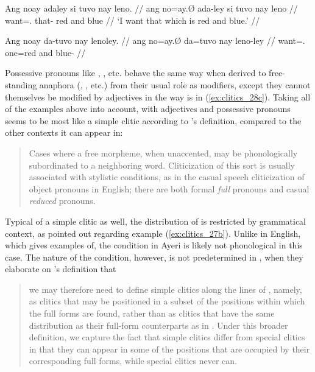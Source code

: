 \a\label{ex:clitics_29c}\begingl
	\gla Ang noay adaley si tuvo nay leno. //
	\glb ang no=ay.Ø ada-ley si tuvo nay leno //
	\glc \AgtT{} want=\Fsg{}.\Top{} that-\PargI{} \Rel{} red and blue //
	\glft `I want that which is red and blue.' //
\endgl

\a\label{ex:clitics_29d}\ljudge{*}\begingl
	\gla Ang noay da-tuvo nay lenoley. //
	\glb ang no=ay.Ø da=tuvo nay leno-ley //
	\glc \AgtT{} want=\Fsg{}.\Top{} one=red and blue-\PargI{} //
\endgl
\xe

Possessive pronouns like , , etc. behave
the same way when derived to free-standing anaphora 
(, , etc.) from their
usual role as modifiers, except they cannot themselves be modified by
adjectives in the way  is in
(\ref{ex:clitics_28c}). Taking all of the examples above into account,
 with adjectives and possessive pronouns seems to be most like a
simple clitic according to \citet{zwicky1977}'s definition, compared to the
other contexts it can appear in:

\blockcquote[5]{zwicky1977}{Cases where a free morpheme, when unaccented, may
be phonologically subordinated to a neighboring word. Cliticization of this
sort is usually associated with stylistic conditions, as in the casual speech
cliticization of object pronouns in English; there are both formal \emph{full}
pronouns and casual \emph{reduced} pronouns.}

Typical of a simple clitic as well, the distribution of  is
restricted by grammatical context, as pointed out regarding example
(\ref{ex:clitics_27b}). Unlike in English, which \citet{zwicky1977} gives
examples of, the condition in Ayeri is likely not phonological in this case.
The nature of the condition, however, is not predetermined in
\citet{spencerluis2012}, when they elaborate on \citet{zwicky1977}'s definition
that

\blockcquote[44]{spencerluis2012}{we may therefore need to define simple
clitics along the lines of \citet{halpern1998}, namely, as clitics that may be
positioned in a subset of the positions within which the full forms are found,
rather than as clitics that have the same distribution as their full-form
counterparts as in \citet{zwicky1977}. Under this broader definition, we
capture the fact that simple clitics differ from special clitics in that they
can appear in some of the positions that are occupied by their corresponding
full forms, while special clitics never can.}

